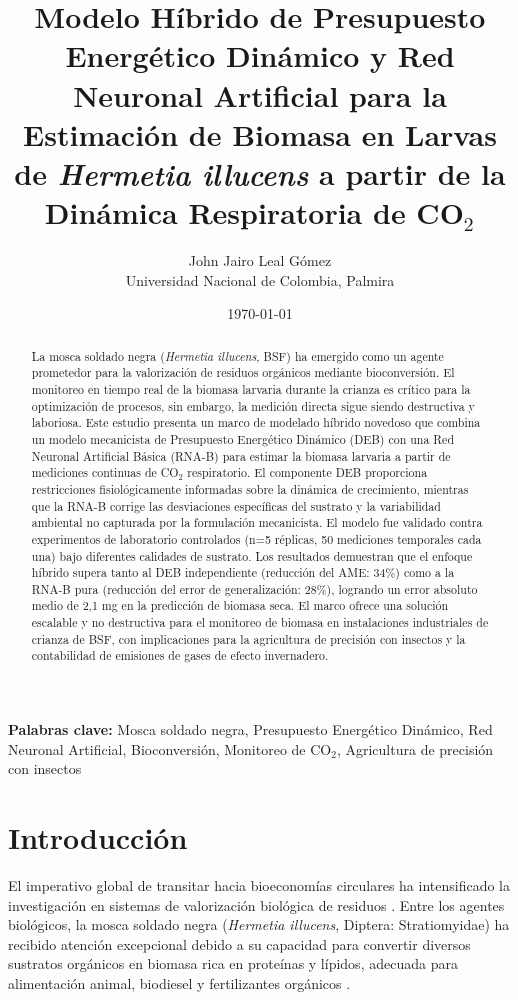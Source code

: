 \documentclass[12pt,a4paper]{article}
\title{Modelo H\'{i}brido de Presupuesto Energ\'{e}tico Din\'{a}mico y Red Neuronal Artificial para la Estimaci\'{o}n de Biomasa en Larvas de \textit{Hermetia illucens} a partir de la Din\'{a}mica Respiratoria de CO$_2$}
\author{John Jairo Leal G\'{o}mez \\ Universidad Nacional de Colombia, Palmira}
\date{\today}
\begin{document}
\maketitle

\begin{abstract}
\noindent La mosca soldado negra (\textit{Hermetia illucens}, BSF) ha emergido como un agente prometedor para la valorizaci\'{o}n de residuos org\'{a}nicos mediante bioconversi\'{o}n. El monitoreo en tiempo real de la biomasa larvaria durante la crianza es cr\'{i}tico para la optimizaci\'{o}n de procesos, sin embargo, la medici\'{o}n directa sigue siendo destructiva y laboriosa. Este estudio presenta un marco de modelado h\'{i}brido novedoso que combina un modelo mecanicista de Presupuesto Energ\'{e}tico Din\'{a}mico (DEB) con una Red Neuronal Artificial B\'{a}sica (RNA-B) para estimar la biomasa larvaria a partir de mediciones continuas de CO$_2$ respiratorio. El componente DEB proporciona restricciones fisiol\'{o}gicamente informadas sobre la din\'{a}mica de crecimiento, mientras que la RNA-B corrige las desviaciones espec\'{i}ficas del sustrato y la variabilidad ambiental no capturada por la formulaci\'{o}n mecanicista. El modelo fue validado contra experimentos de laboratorio controlados (n=5 r\'{e}plicas, 50 mediciones temporales cada una) bajo diferentes calidades de sustrato. Los resultados demuestran que el enfoque h\'{i}brido supera tanto al DEB independiente (reducci\'{o}n del AME: 34\%) como a la RNA-B pura (reducci\'{o}n del error de generalizaci\'{o}n: 28\%), logrando un error absoluto medio de 2,1 mg en la predicci\'{o}n de biomasa seca. El marco ofrece una soluci\'{o}n escalable y no destructiva para el monitoreo de biomasa en instalaciones industriales de crianza de BSF, con implicaciones para la agricultura de precisi\'{o}n con insectos y la contabilidad de emisiones de gases de efecto invernadero.
\end{abstract}

\noindent\textbf{Palabras clave:} Mosca soldado negra, Presupuesto Energ\'{e}tico Din\'{a}mico, Red Neuronal Artificial, Bioconversi\'{o}n, Monitoreo de CO$_2$, Agricultura de precisi\'{o}n con insectos

\section{Introducci\'{o}n}

El imperativo global de transitar hacia bioeconom\'{i}as circulares ha intensificado la investigaci\'{o}n en sistemas de valorizaci\'{o}n biol\'{o}gica de residuos \citep{goldBiowasteTreatmentBlack2020}. Entre los agentes biol\'{o}gicos, la mosca soldado negra (\textit{Hermetia illucens}, Diptera: Stratiomyidae) ha recibido atenci\'{o}n excepcional debido a su capacidad para convertir diversos sustratos org\'{a}nicos en biomasa rica en prote\'{i}nas y l\'{i}pidos, adecuada para alimentaci\'{o}n animal, biodiesel y fertilizantes org\'{a}nicos \citep{makkarStateoftheartUseInsects2014, liSimultaneousUtilizationGlucose2015}.
\end{document}
